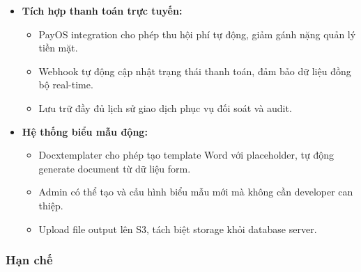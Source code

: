 \begin{itemize}
    \item \textbf{Tích hợp thanh toán trực tuyến:}
    \begin{itemize}
        \item PayOS integration cho phép thu hội phí tự động, giảm gánh nặng quản lý tiền mặt.
        \item Webhook tự động cập nhật trạng thái thanh toán, đảm bảo dữ liệu đồng bộ real-time.
        \item Lưu trữ đầy đủ lịch sử giao dịch phục vụ đối soát và audit.
    \end{itemize}
    
    \item \textbf{Hệ thống biểu mẫu động:}
    \begin{itemize}
        \item Docxtemplater cho phép tạo template Word với placeholder, tự động generate document từ dữ liệu form.
        \item Admin có thể tạo và cấu hình biểu mẫu mới mà không cần developer can thiệp.
        \item Upload file output lên S3, tách biệt storage khỏi database server.
    \end{itemize}
\end{itemize}

\subsubsection{Hạn chế}

